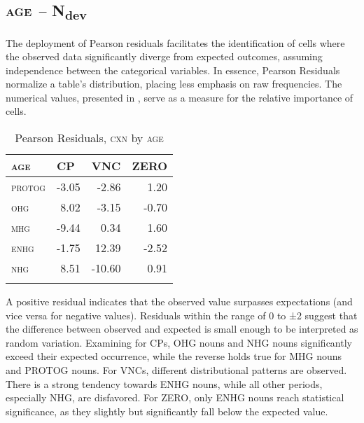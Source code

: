 \documentclass[output=paper,colorlinks,citecolor=brown]{langscibook}
\begin{document}
\subsection{\textsc{age} \textit{–} N\textsubscript{dev}}\label{sec:fleissner:4.1}
The deployment of Pearson residuals facilitates the identification of cells where the observed data significantly diverge from expected outcomes, assuming independence between the categorical variables. In essence, Pearson Residuals normalize a table's distribution, placing less emphasis on raw frequencies. The numerical values, presented in , serve as a measure for the relative importance of cells.

\begin{table}
\begin{tabularx}{0.45\textwidth}{lrrr}
\lsptoprule
\textsc{age} &  \multicolumn{1}{l}{CP} &  \multicolumn{1}{l}{VNC} &  \multicolumn{1}{l}{ZERO}\\
\midrule
\textsc{protog} & {{}-3.05} & {{}-2.86} & {1.20}\\
\textsc{ohg} & {8.02} & {{}-3.15} & {-0.70}\\
\textsc{mhg} & {{}-9.44} & {0.34} & {1.60}\\
\textsc{enhg} & {{}-1.75} & {12.39} & {-2.52}\\
\textsc{nhg} & {8.51} & {{}-10.60} & {0.91}\\
\lspbottomrule
\end{tabularx}
\caption{Pearson Residuals, \textsc{cxn} \textup{by} \textsc{age}}
\label{tab:fleissner:5}
\end{table}

A positive residual indicates that the observed value surpasses expectations (and vice versa for negative values). Residuals within the range of 0 to ±2 suggest that the difference between observed and expected is small enough to be interpreted as random variation. Examining  for CPs, OHG nouns and NHG nouns significantly exceed their expected occurrence, while the reverse holds true for MHG nouns and PROTOG nouns. For VNCs, different distributional patterns are observed. There is a strong tendency towards ENHG nouns, while all other periods, especially NHG, are disfavored. For ZERO, only ENHG nouns reach statistical significance, as they slightly but significantly fall below the expected value. 
\end{document}
